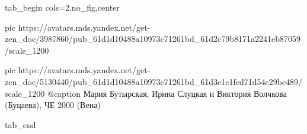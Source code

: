  
 
 
 
 


\ifcmt
  tab_begin cols=2,no_fig,center

     pic https://avatars.mds.yandex.net/get-zen_doc/3987860/pub_61d1d10488a10973c71261bd_61d2c79b8171a2241eb87059/scale_1200

		 pic https://avatars.mds.yandex.net/get-zen_doc/5130440/pub_61d1d10488a10973c71261bd_61d3e1c1fed71d54e29be489/scale_1200
		 @caption Мария Бутырская, Ирина Слуцкая и Виктория Волчкова (Буцаева), ЧЕ 2000 (Вена)

  tab_end
\fi
